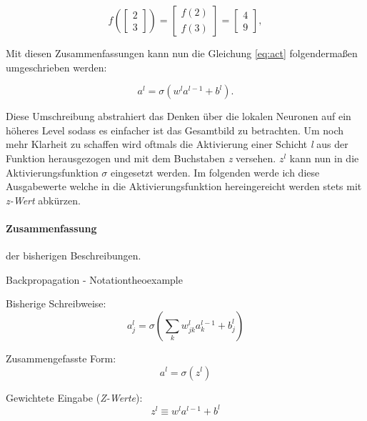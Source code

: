 \begin{equation}
  f\left(\left[ \begin{array}{c} 2 \\ 3 \end{array} \right] \right)
  = \left[ \begin{array}{c} f(2) \\ f(3) \end{array} \right]
  = \left[ \begin{array}{c} 4 \\ 9 \end{array} \right],
\end{equation}

Mit diesen Zusammenfassungen kann nun die Gleichung \ref{eq:act} folgendermaßen umgeschrieben werden: 

\begin{equation}
  a^{l} = \sigma(w^l a^{l-1}+b^l).
\end{equation}

Diese Umschreibung abstrahiert das Denken über die lokalen Neuronen auf ein höheres Level sodass es einfacher ist das Gesamtbild zu betrachten. Um noch mehr Klarheit zu schaffen wird oftmals die Aktivierung einer Schicht \emph{l} aus der Funktion herausgezogen und mit dem Buchstaben \emph{z} versehen. $z^l$ kann nun in die Aktivierungsfunktion $\sigma$ eingesetzt werden. Im folgenden werde ich diese Ausgabewerte welche in die Aktivierungsfunktion hereingereicht werden stets mit \emph{z-Wert} abkürzen. 

\paragraph{Zusammenfassung} der bisherigen Beschreibungen.

\begin{mytheo}{Backpropagation - Notation}{theoexample}

Bisherige Schreibweise:
\begin{equation}
  a^{l}_j = \sigma\left( \sum_k w^{l}_{jk} a^{l-1}_k + b^l_j \right) \nonumber
\end{equation}

Zusammengefasste Form:
\begin{equation} \label{eq:zusForm}
a^l = \sigma(z^l)
\end{equation}

Gewichtete Eingabe (\emph{Z-Werte}):
\begin{equation} \label{eq:gewEin}
  z^l \equiv w^l a^{l-1}+b^l
\end{equation}

\end{mytheo}

